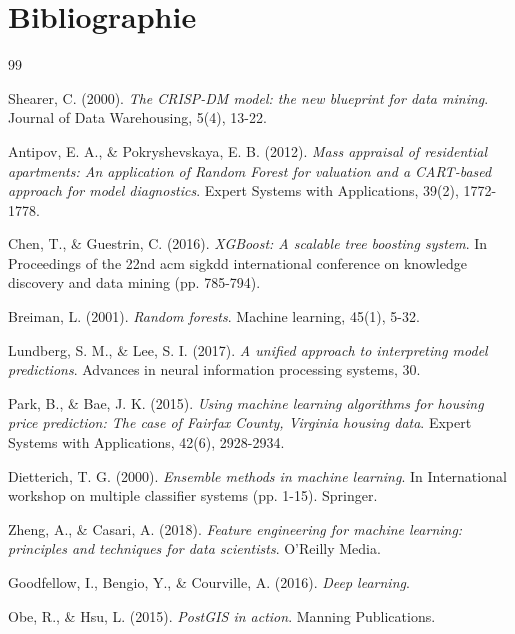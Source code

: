 
\chapter*{Bibliographie}

\begin{thebibliography}{99}

Shearer, C. (2000). 
\textit{The CRISP-DM model: the new blueprint for data mining}. 
Journal of Data Warehousing, 5(4), 13-22.

Antipov, E. A., \& Pokryshevskaya, E. B. (2012). 
\textit{Mass appraisal of residential apartments: An application of Random Forest for valuation and a CART-based approach for model diagnostics}. 
Expert Systems with Applications, 39(2), 1772-1778.

Chen, T., \& Guestrin, C. (2016). 
\textit{XGBoost: A scalable tree boosting system}. 
In Proceedings of the 22nd acm sigkdd international conference on knowledge discovery and data mining (pp. 785-794).

Breiman, L. (2001). 
\textit{Random forests}. 
Machine learning, 45(1), 5-32.

Lundberg, S. M., \& Lee, S. I. (2017). 
\textit{A unified approach to interpreting model predictions}. 
Advances in neural information processing systems, 30.

Park, B., \& Bae, J. K. (2015). 
\textit{Using machine learning algorithms for housing price prediction: The case of Fairfax County, Virginia housing data}. 
Expert Systems with Applications, 42(6), 2928-2934.

Dietterich, T. G. (2000). 
\textit{Ensemble methods in machine learning}. 
In International workshop on multiple classifier systems (pp. 1-15). Springer.

Zheng, A., \& Casari, A. (2018). 
\textit{Feature engineering for machine learning: principles and techniques for data scientists}. 
O'Reilly Media.

Goodfellow, I., Bengio, Y., \& Courville, A. (2016). 
\textit{Deep learning}. 


Obe, R., \& Hsu, L. (2015). 
\textit{PostGIS in action}. 
Manning Publications.


\end{thebibliography}
